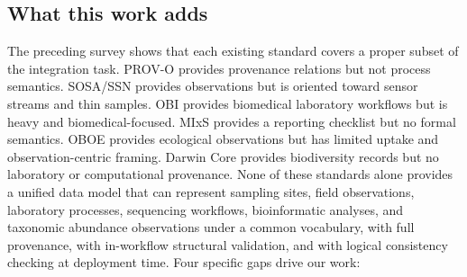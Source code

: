 \documentclass[11pt,a4paper]{article}
\begin{document}
\subsection{What this work adds}\label{subsec:what_we_add}

The preceding survey shows that each existing standard covers a
proper subset of the integration task. PROV-O provides provenance
relations but not process semantics. SOSA/SSN provides observations
but is oriented toward sensor streams and thin samples. OBI provides
biomedical laboratory workflows but is heavy and biomedical-focused.
MIxS provides a reporting checklist but no formal semantics. OBOE
provides ecological observations but has limited uptake and
observation-centric framing. Darwin Core provides biodiversity
records but no laboratory or computational provenance. None of these
standards alone provides a unified data model that can represent
sampling sites, field observations, laboratory processes, sequencing
workflows, bioinformatic analyses, and taxonomic abundance
observations under a common vocabulary, with full provenance, with
in-workflow structural validation, and with logical consistency
checking at deployment time. Four specific gaps drive our work:
\end{document}
